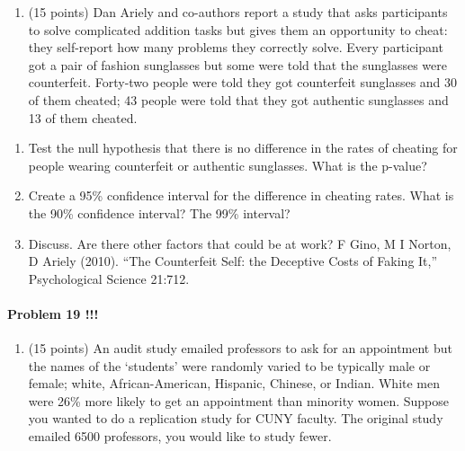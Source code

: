 \documentclass[]{article}
\providecommand{\tightlist}{%
  \setlength{\itemsep}{0pt}\setlength{\parskip}{0pt}}
\let\oldparagraph\paragraph
\renewcommand{\paragraph}[1]{\oldparagraph{#1}\mbox{}}
\begin{document}
\begin{enumerate}
\def\labelenumi{\arabic{enumi}.}
\setcounter{enumi}{19}
\tightlist
\item
  (15 points) Dan Ariely and co-authors report a study that asks
  participants to solve complicated addition tasks but gives them an
  opportunity to cheat: they self-report how many problems they
  correctly solve. Every participant got a pair of fashion sunglasses
  but some were told that the sunglasses were counterfeit. Forty-two
  people were told they got counterfeit sunglasses and 30 of them
  cheated; 43 people were told that they got authentic sunglasses and 13
  of them cheated.
\end{enumerate}

\begin{enumerate}
\def\labelenumi{\alph{enumi}.}
\tightlist
\item
  Test the null hypothesis that there is no difference in the rates of
  cheating for people wearing counterfeit or authentic sunglasses. What
  is the p-value?
\item
  Create a 95\% confidence interval for the difference in cheating
  rates. What is the 90\% confidence interval? The 99\% interval?
\item
  Discuss. Are there other factors that could be at work? F Gino, M I
  Norton, D Ariely (2010). ``The Counterfeit Self: the Deceptive Costs
  of Faking It,'' Psychological Science 21:712.
\end{enumerate}

\paragraph{Problem 19 !!!}\label{problem-19}

\begin{enumerate}
\def\labelenumi{\arabic{enumi}.}
\setcounter{enumi}{20}
\tightlist
\item
  (15 points) An audit study emailed professors to ask for an
  appointment but the names of the `students' were randomly varied to be
  typically male or female; white, African-American, Hispanic, Chinese,
  or Indian. White men were 26\% more likely to get an appointment than
  minority women. Suppose you wanted to do a replication study for CUNY
  faculty. The original study emailed 6500 professors, you would like to
  study fewer.
\end{enumerate}
\end{document}
